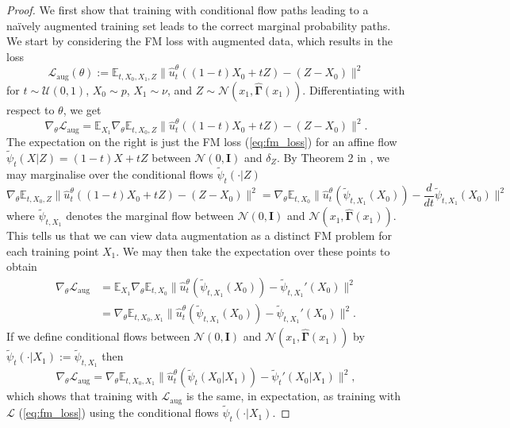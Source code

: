 \documentclass{article} %
\newcommand{\E}{\mathbb{E}}
\newcommand{\Ls}{\mathcal{L}}
\newcommand{\N}{\mathcal{N}}
\newcommand{\I}{\mathbf{I}}
\newcommand{\G}{\widehat{\mathbf{\Gamma}}}
\begin{document}
\begin{proof}
We first show that training with conditional flow paths leading to a naïvely augmented training set leads to the correct marginal probability paths.
We start by considering the FM loss with augmented data, which results in the loss
%
\begin{equation}
\label{eq:CFM loss augmentation}
\Ls_{\text{aug}}(\theta) := \E_{t,X_0, X_1, Z} \|\hat{u}^\theta_t((1-t)X_0 + tZ) - (Z - X_0)\|^2
\end{equation}
%
for $t \sim \mathcal{U}(0,1)$, $X_0 \sim p$, $X_1 \sim \nu$, and $Z \sim \N(x_1, \G(x_1))$.
%
Differentiating with respect to $\theta$, we get
%
\begin{equation}
\nabla_{\theta} \Ls_{\text{aug}}
= \E_{X_1} \nabla_{\theta} \E_{t, X_0, Z} 
\|\hat{u}^\theta_t((1-t)X_0 + tZ) - (Z - X_0)\|^2.
\end{equation}
%
The expectation on the right is just the FM loss (\ref{eq:fm_loss}) for an affine flow $\widetilde{\psi}_t(X|Z) = (1-t)X + tZ$ between $\N(0, \I)$ and $\delta_Z$.
By Theorem 2 in \cite{lipman2023flow}, we may marginalise over the conditional flows $\widetilde{\psi}_t(\cdot|Z)$
%
\begin{equation}
\label{eq:augmentation proof lemma}
\nabla_{\theta} \E_{t, X_0, Z} \|\hat{u}^\theta_t((1-t)X_0 + tZ) - (Z - X_0)\|^2
= \nabla_{\theta} \E_{t, X_0} \|\hat{u}^\theta_t(\widetilde{\psi}_{t, X_1}(X_0)) - \frac{d}{dt}\widetilde{\psi}_{t, X_1}(X_0)\|^2
\end{equation}
%
where $\widetilde{\psi}_{t, X_1}$ denotes the marginal flow between $\N(0, \I)$ and $\N(x_1, \G(x_1))$.
This tells us that we can view data augmentation as a distinct FM problem for each training point $X_1$. 
We may then take the expectation over these points to obtain
%
\begin{align*}
\nabla_{\theta} \Ls_{\text{aug}}
&= \E_{X_1} \nabla_{\theta} \E_{t, X_0} \|\hat{u}^\theta_t(\widetilde{\psi}_{t, X_1}( X_0 )) - \widetilde{\psi}_{t, X_1}'( X_0)\|^2 \\
&= \nabla_{\theta} \E_{t, X_0, X_1} 
\|\hat{u}^\theta_t(\widetilde{\psi}_{t, X_1}( X_0 )) - \widetilde{\psi}_{t, X_1}'( X_0)\|^2.
\end{align*}
%
If we define conditional flows between $\N(0, \I)$ and $\N(x_1, \G(x_1))$ by
\(
\widetilde{\psi}_{t}( \cdot | X_1 ) := \widetilde{\psi}_{t, X_1}
\)
then
%
\begin{equation}
\nabla_{\theta} \Ls_{\text{aug}}
= \nabla_{\theta} \E_{t, X_0, X_1} 
\|\hat{u}^\theta_t(\widetilde{\psi}_{t}( X_0| X_1 )) - \widetilde{\psi}_{t}'( X_0| X_1 )\|^2,
\end{equation}
%
which shows that training with $\Ls_{\text{aug}}$ is the same, in expectation, as training with $\Ls$ (\ref{eq:fm_loss}) using the conditional flows $\widetilde{\psi}_{t}( \cdot| X_1 )$.


\end{proof}
\end{document}

